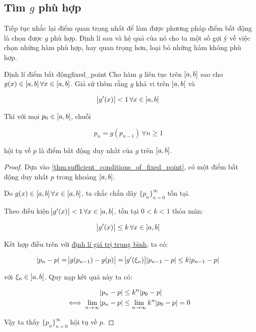 \documentclass[../../Lectures]{subfiles}
\begin{document}
\subsection{Tìm \texorpdfstring{\(g\)}{g} phù hợp}

Tiếp tục nhắc lại điểm quan trọng nhất để làm được phương pháp điểm bất động là
chọn được \(g\) phù hợp. Định lí sau và hệ quả của nó cho ta một số gợi ý về
việc chọn những hàm phù hợp, hay quan trọng hơn, loại bỏ những hàm không phù
hợp.

\begin{ctheorem}{Định lí điểm bất động}{fixed_point}
    Cho hàm \(g\) liên tục trên \(\interval{a}{b}\) sao cho \(g(x) \in
    \interval{a}{b} \, \forall x \in \interval{a}{b}\). Giả sử thêm rằng \(g\)
    khả vi trên \(\interval[open]{a}{b}\) và

    \[\abs{g'(x)} < 1 \, \forall x \in \interval[open]{a}{b}\]

    Thì với mọi \(p_0 \in \interval{a}{b}\), chuỗi

    \[p_n = g(p_{n - 1}) \, \forall n \geq 1\]

    hội tụ về \(p\) là điểm bất động duy nhất của \(g\) trên
    \(\interval{a}{b}\).
\end{ctheorem}

\begin{proof}\label{proof:thm:fixed_point}
    Dựa vào \ref{thm:sufficient_conditions_of_fixed_point}, có một điểm bất động
    duy nhất \(p\) trong khoảng \(\interval{a}{b}\).

    Do \(g(x) \in \interval{a}{b} \, \forall x \in \interval{a}{b}\), ta chắc
    chắn dãy \(\{p_n\}_{n = 0}^\infty\) tồn tại.

    Theo điều kiện \(\abs{g'(x)} < 1 \, \forall x \in \interval[open]{a}{b}\),
    tồn tại \(0 < k < 1\) thỏa mãn:

    \[\abs{g'(x)} \leq k \, \forall x \in \interval[open]{a}{b}\]

    Kết hợp điều trên với \hyperref[thm:mean_value_theorem]{định lí giá trị
    trung bình}, ta có:

    \[\abs{p_n - p} = \abs{g(p_{n - 1}) - g(p)} = \abs{g'(\xi_n)} \abs{p_{n - 1} - p} \leq k \abs{p_{n - 1} - p}\]

    với \(\xi_n \in \interval[open]{a}{b}\). Quy nạp kết quả này ta có:

    \begin{align*}
                                 \abs{p_n - p} & \leq k^n \abs{p_0 - p} \\
        \iff \lim_{n \to \infty} \abs{p_n - p} & \leq \lim_{n \to \infty} k^n \abs{p_0 - p} = 0
    \end{align*}

    Vậy ta thấy \(\{p_n\}_{n = 0}^\infty\) hội tụ về \(p\).
\end{proof}
\end{document}
